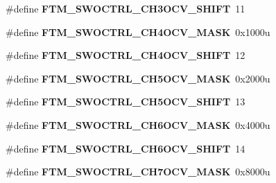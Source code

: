 \begin{DoxyCompactItemize}
\item 
\hypertarget{group___f_t_m___register___masks_gaf19ff618a9c962801b0aba2036e48ec8}{}\#define {\bfseries F\+T\+M\+\_\+\+S\+W\+O\+C\+T\+R\+L\+\_\+\+C\+H3\+O\+C\+V\+\_\+\+S\+H\+I\+F\+T}~11\label{group___f_t_m___register___masks_gaf19ff618a9c962801b0aba2036e48ec8}

\item 
\hypertarget{group___f_t_m___register___masks_ga5cc982d14b624ca50169e1c98d02e4ff}{}\#define {\bfseries F\+T\+M\+\_\+\+S\+W\+O\+C\+T\+R\+L\+\_\+\+C\+H4\+O\+C\+V\+\_\+\+M\+A\+S\+K}~0x1000u\label{group___f_t_m___register___masks_ga5cc982d14b624ca50169e1c98d02e4ff}

\item 
\hypertarget{group___f_t_m___register___masks_ga38757966eb256ada3ab6800fdde3574f}{}\#define {\bfseries F\+T\+M\+\_\+\+S\+W\+O\+C\+T\+R\+L\+\_\+\+C\+H4\+O\+C\+V\+\_\+\+S\+H\+I\+F\+T}~12\label{group___f_t_m___register___masks_ga38757966eb256ada3ab6800fdde3574f}

\item 
\hypertarget{group___f_t_m___register___masks_ga15f2f2e7d6753053cffd4cd6a2de90e5}{}\#define {\bfseries F\+T\+M\+\_\+\+S\+W\+O\+C\+T\+R\+L\+\_\+\+C\+H5\+O\+C\+V\+\_\+\+M\+A\+S\+K}~0x2000u\label{group___f_t_m___register___masks_ga15f2f2e7d6753053cffd4cd6a2de90e5}

\item 
\hypertarget{group___f_t_m___register___masks_gae269ab2d5353429a637b5ec4fabd55d8}{}\#define {\bfseries F\+T\+M\+\_\+\+S\+W\+O\+C\+T\+R\+L\+\_\+\+C\+H5\+O\+C\+V\+\_\+\+S\+H\+I\+F\+T}~13\label{group___f_t_m___register___masks_gae269ab2d5353429a637b5ec4fabd55d8}

\item 
\hypertarget{group___f_t_m___register___masks_ga3b9f11da0d8d83fba974c4aaba2dac8a}{}\#define {\bfseries F\+T\+M\+\_\+\+S\+W\+O\+C\+T\+R\+L\+\_\+\+C\+H6\+O\+C\+V\+\_\+\+M\+A\+S\+K}~0x4000u\label{group___f_t_m___register___masks_ga3b9f11da0d8d83fba974c4aaba2dac8a}

\item 
\hypertarget{group___f_t_m___register___masks_ga5f2de43ea7c9508165b8829009f2171f}{}\#define {\bfseries F\+T\+M\+\_\+\+S\+W\+O\+C\+T\+R\+L\+\_\+\+C\+H6\+O\+C\+V\+\_\+\+S\+H\+I\+F\+T}~14\label{group___f_t_m___register___masks_ga5f2de43ea7c9508165b8829009f2171f}

\item 
\hypertarget{group___f_t_m___register___masks_gaeb2705f6572eaf6bcf1f868c8f70f6c2}{}\#define {\bfseries F\+T\+M\+\_\+\+S\+W\+O\+C\+T\+R\+L\+\_\+\+C\+H7\+O\+C\+V\+\_\+\+M\+A\+S\+K}~0x8000u\label{group___f_t_m___register___masks_gaeb2705f6572eaf6bcf1f868c8f70f6c2}


\end{DoxyCompactItemize}
